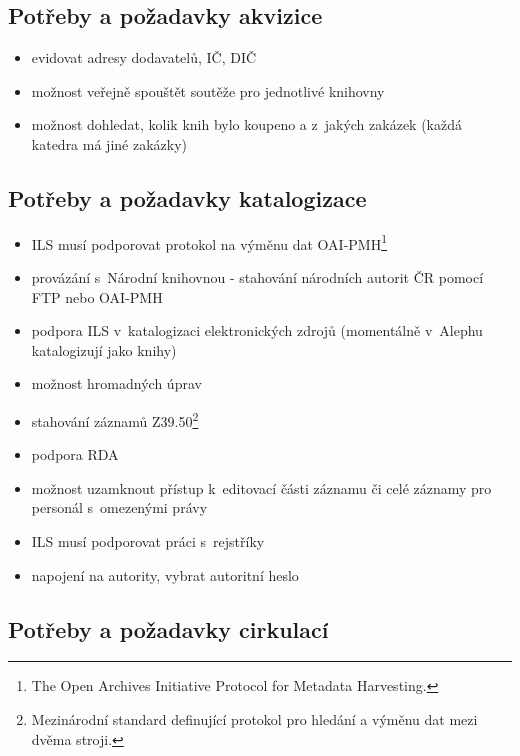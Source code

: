 \documentclass[
	11pt, oneside, printed, final, palatino, monochrome
	microtype,
	table,   %
	lof,     %
	lot     %
]{fithesis3}
\begin{document}
{\subsection{Potřeby a požadavky akvizice}

\begin{itemize}
\item evidovat adresy dodavatelů, IČ, DIČ
\item možnost veřejně spouštět soutěže pro jednotlivé knihovny
\item možnost dohledat, kolik knih bylo koupeno a z~jakých zakázek (každá katedra má jiné zakázky)
\end{itemize}

\subsection{Potřeby a požadavky katalogizace}

\begin{itemize}
\item ILS musí podporovat protokol na výměnu dat OAI-PMH\footnote{The Open Archives Initiative Protocol for Metadata Harvesting.}
\item provázání s~Národní knihovnou - stahování národních autorit ČR pomocí FTP nebo OAI-PMH
\item podpora ILS v~katalogizaci elektronických zdrojů (momentálně v~Alephu katalogizují jako knihy)
\item možnost hromadných úprav
\item stahování záznamů Z39.50\footnote{Mezinárodní standard definující protokol pro hledání a výměnu dat mezi dvěma stroji.}
\item podpora RDA
\item možnost uzamknout přístup k~editovací části záznamu či celé záznamy pro personál s~omezenými právy
\item ILS musí podporovat práci s~rejstříky
\item napojení na autority, vybrat autoritní heslo
\end{itemize}

\subsection{Potřeby a požadavky cirkulací}

}
\end{document}
